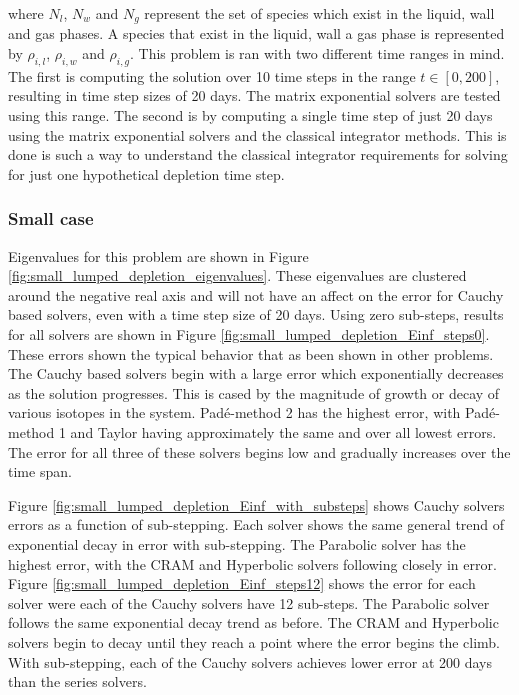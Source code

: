 \noindent where $N_{l}$, $N_{w}$ and $N_{g}$ represent the set of species which exist in the liquid, wall and gas phases. A species that exist in the liquid, wall a gas phase is represented by $\rho_{i,l}$, $\rho_{i,w}$ and $\rho_{i,g}$.  This problem is ran with two different time ranges in mind. The first is computing the solution over 10 time steps in the range $t \in [0, 200]$, resulting in time step sizes of 20 days. The matrix exponential solvers are tested using this range. The second is by computing a single time step of just 20 days using the matrix exponential solvers and the classical integrator methods. This is done is such a way to understand the classical integrator requirements for solving for just one hypothetical depletion time step. 

\subsubsection{Small case}
Eigenvalues for this problem are shown in Figure \ref{fig:small_lumped_depletion_eigenvalues}. These eigenvalues are clustered around the negative real axis and will not have an affect on the error for Cauchy based solvers, even with a time step size of 20 days. Using zero sub-steps, results for all solvers are shown in Figure \ref{fig:small_lumped_depletion_Einf_steps0}. These errors shown the typical behavior that as been shown in other problems. The Cauchy based solvers begin with a large error which exponentially decreases as the solution progresses. This is cased by the magnitude of growth or decay of various isotopes in the system. Pad\'e-method 2 has the highest error, with Pad\'e-method 1 and Taylor having approximately the same and over all lowest errors. The error for all three of these solvers begins low and gradually increases over the time span. 

Figure \ref{fig:small_lumped_depletion_Einf_with_substeps} shows Cauchy solvers errors as a function of sub-stepping. Each solver shows the same general trend of exponential decay in error with sub-stepping. The Parabolic solver has the highest error, with the CRAM and Hyperbolic solvers following closely in error. Figure \ref{fig:small_lumped_depletion_Einf_steps12} shows the error for each solver were each of the Cauchy solvers have 12 sub-steps. The Parabolic solver follows the same exponential decay trend as before. The CRAM and Hyperbolic solvers begin to decay until they reach a point where the error begins the climb. With sub-stepping, each of the Cauchy solvers achieves lower error at 200 days than the series solvers. 

